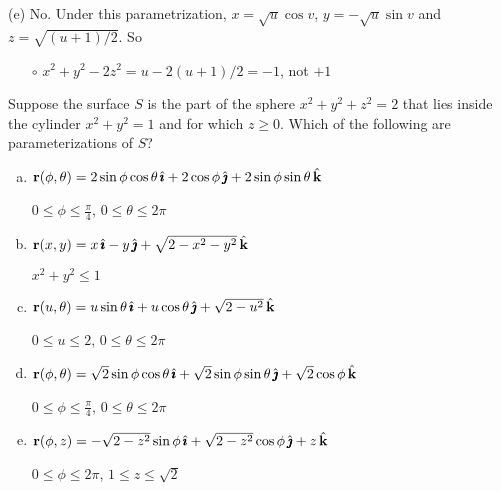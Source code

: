 \begin{solution}
\noindent (e) No. Under this parametrization, $x=\sqrt{u}\cos v$, 
$y=-\sqrt{u}\sin v$ and $z=\sqrt{(u+1)/2}$. So
\begin{itemize}\itemsep1pt \parskip0pt  %
\item[$\circ$]
$x^2+y^2-2z^2 = u -2(u+1)/2 = -1$, not $+1$

\end{itemize}

\end{solution}

\begin{question}[M317 2008A] %
Suppose the surface $S$ is the part of the sphere $x^2 + y^2 + z^2 = 2$ 
that lies inside the cylinder
$x^2 + y^2 = 1$ and for which $z \ge 0$.
Which of the following are parameterizations of $S$?
%

\begin{enumerate}[(a)]
\item  %
$\mathbf{r}(\phi,\theta) = 2\sin \phi\cos\theta\,\hat{\pmb{\imath}}  +2\cos \phi\,\hat{\pmb{\jmath}} 
                    +2\sin \phi\sin\theta\,\hat{\mathbf{k}} $

$0\le\phi\le\frac{\pi}{4}$, $0\le\theta\le2\pi$


\item  %
$\mathbf{r}(x,y) = x\,\hat{\pmb{\imath}} -y\,\hat{\pmb{\jmath}} +\sqrt{2-x^2-y^2}\,\hat{\mathbf{k}} $

$x^2+y^2\le 1$


\item  %
$\mathbf{r}(u,\theta) = u\sin\theta\,\hat{\pmb{\imath}}  +u\cos \theta\,\hat{\pmb{\jmath}} 
                    +\sqrt{2-u^2}\,\hat{\mathbf{k}} $

$0\le u\le 2$, $0\le\theta\le2\pi$

\item  %
$\mathbf{r}(\phi,\theta) = \sqrt{2}\sin \phi\cos\theta\,\hat{\pmb{\imath}}  
                   +\sqrt{2}\sin \phi\sin\theta\,\hat{\pmb{\jmath}} 
                    +\sqrt{2}\cos \phi\,\hat{\mathbf{k}} $

$0\le\phi\le\frac{\pi}{4}$, $0\le\theta\le2\pi$


\item  %
$\mathbf{r}(\phi,z) = -\sqrt{2-z^2}\sin \phi\,\hat{\pmb{\imath}}  
                   +\sqrt{2-z^2}\cos \phi\,\hat{\pmb{\jmath}} 
                    +z\,\hat{\mathbf{k}} $

$0\le\phi\le2\pi$, $1\le z\le\sqrt{2}$

\end{enumerate}
\end{question}

